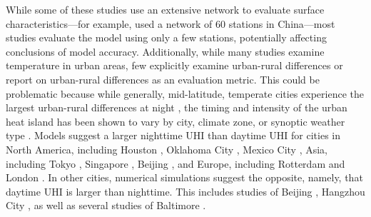 \documentclass[draft,linenumbers]{agujournal}
\begin{document}
While some of these studies use an extensive network to evaluate surface characteristics---for example, \cite{miao2011impacts} used a network of 60 stations in China---most studies evaluate the model using only a few stations, potentially affecting conclusions of model accuracy. 
Additionally, while many studies examine temperature in urban areas, few explicitly examine urban-rural differences or report on urban-rural differences as an evaluation metric. This could be problematic because while generally, mid-latitude, temperate cities experience the largest urban-rural differences at night \citep{oke82,scott2018reduced}, the timing and intensity of the urban heat island has been shown to vary by city, climate zone, or synoptic weather type \cite{hardin2017urban}. 
Models suggest a larger nighttime UHI than daytime UHI for cities in North America, including Houston \citep{chen2011numerical}, Oklahoma City \citep{hu2013impact}, Mexico City \citep{cui2012seasonal}, Asia, including Tokyo \citep{kusaka2012urban}, Singapore \citep{li2013multi}, Beijing \citep{wang2013contribution}, and Europe, including Rotterdam \citep{theeuwes2014seasonal} and London \citep{grawe2013modelling}.
In other cities, numerical simulations suggest the opposite, namely, that daytime UHI is larger than nighttime. This includes studies of Beijing \citep{zhang2011impact}, Hangzhou City \citep{chen2014wrf}, as well as several studies of Baltimore \citep{zhang2011impact,li2013synergistic, li2015contrasting}.
\end{document}
